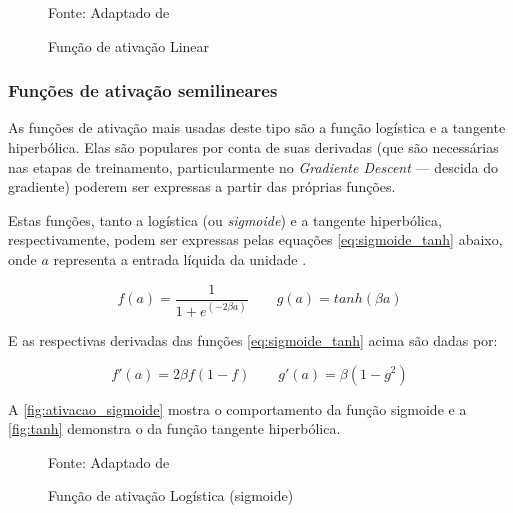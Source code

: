 \begin{figure}[h!]
	\centering
	\caption{Função de ativação Linear}

	{\scriptsize Fonte: Adaptado de }
	\label{fig:ativacao_linear}
\end{figure}

\subsubsection{Funções de ativação semilineares}\label{ativacao_semilinear}
As funções de ativação mais usadas deste tipo são a função logística e a tangente hiperbólica. Elas são populares por conta de suas derivadas (que são necessárias nas etapas de treinamento, particularmente no \textit{Gradiente Descent} --- descida do gradiente) poderem ser expressas a partir das próprias funções.

Estas funções, tanto a logística (ou \textit{sigmoide}) e a tangente hiperbólica, respectivamente, podem ser expressas pelas equações \ref{eq:sigmoide_tanh} abaixo, onde $a$ representa a entrada líquida da unidade \cite{haykin_redes_2001} \cite{lima_ia_2016}.

\begin{equation}\label{eq:sigmoide_tanh}
	f(a) = \frac{1}{1+ e^{(-2 \beta a)}} \qquad g(a) = tanh(\beta a)
\end{equation}

E as respectivas derivadas das funções \ref{eq:sigmoide_tanh} acima são dadas por:

\begin{equation}\label{derivadas_sigmoide_tanh}
	f'(a) = 2 \beta f(1-f) \qquad g'(a) = \beta (1-g^2)
\end{equation}

A \autoref{fig:ativacao_sigmoide} mostra o comportamento da função sigmoide e a \autoref{fig:tanh} demonstra o da função tangente hiperbólica.

\begin{figure}[h!]
	\centering
	\caption{Função de ativação Logística (sigmoide)}
	
	{\scriptsize 	Fonte: Adaptado de }
	\label{fig:ativacao_sigmoide}
\end{figure}

